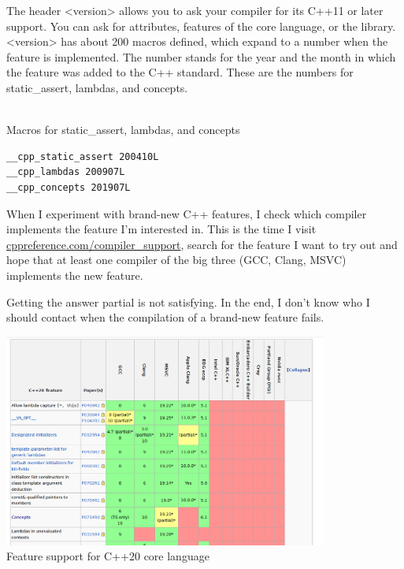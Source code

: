 
The header <version> allows you to ask your compiler for its C++11 or later support. You can ask for attributes, features of the core language, or the library. <version> has about 200 macros defined, which expand to a number when the feature is implemented. The number stands for the year and the month in which the feature was added to the C++ standard. These are the numbers for static\_assert, lambdas, and concepts.

\hspace*{\fill} \\ %
\noindent
Macros for static\_assert, lambdas, and concepts
\begin{lstlisting}[style=styleCXX]
__cpp_static_assert 200410L
__cpp_lambdas 200907L
__cpp_concepts 201907L
\end{lstlisting}

\begin{tcolorbox}[breakable,enhanced jigsaw,colback=blue!5!white,colframe=blue!75!black,title={Feature Support}]
When I experiment with brand-new C++ features, I check which compiler implements the feature I’m interested in. This is the time I visit \href{https://en.cppreference.com/w/cpp/compiler_support}{cppreference.com/compiler\_support}, search for the feature I want to try out and hope that at least one compiler of the big three (GCC, Clang, MSVC) implements the new feature.

Getting the answer partial is not satisfying. In the end, I don’t know who I should contact when the compilation of a brand-new feature fails.
\end{tcolorbox}

\begin{center}
\includegraphics[width=0.8\textwidth]{content/5/chapter9/images/1.png}\\
Feature support for C++20 core language
\end{center}

